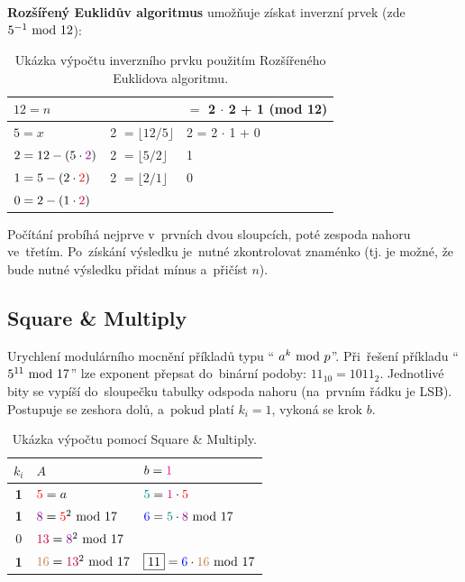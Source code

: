 \vspace*{1em} \noindent
\textbf{Rozšířený Euklidův algoritmus} umožňuje získat inverzní prvek (zde $5^{-1} \ \mathrm{mod}\ 12$):

\begin{table}[ht]
	\centering
\begin{tabular}{ll|l}
	$12 = n$                               & {}                                           & \boxed{\stackrel{?}{\pm} 5} $=$ {\color{violet}2} $\cdot$ {\color{blue}2} + {\color{brown}1} (mod 12) \\
	\hline
	$5 = x$                                & {\color{violet}2} $= \lfloor 12 / 5 \rfloor$ & {\color{blue}2} = {\color{red}2} $\cdot$ {\color{brown}1} + {\color{teal}0} \\
	$2 = 12 - (5 \cdot {\color{violet}2})$ & {\color{red}2}    $= \lfloor 5 / 2 \rfloor$  & {\color{brown}1} \\
	$1 = 5 - (2 \cdot {\color{red}2})$     & {\color{purple}2} $= \lfloor 2 / 1 \rfloor$  & {\color{teal}0} \\
	$0 = 2 - (1 \cdot {\color{purple}2})$  & {}                                           & {}
\end{tabular}
\caption*{Ukázka výpočtu inverzního prvku použitím Rozšířeného Euklidova algoritmu.}
\end{table}

\noindent
Počítání probíhá nejprve v~prvních dvou sloupcích, poté zespoda nahoru ve~třetím. Po~získání výsledku je~nutné zkontrolovat znaménko (tj. je možné, že bude nutné výsledku přidat mínus a~přičíst $n$).

\subsection{Square \& Multiply}

Urychlení modulárního mocnění příkladů typu \enquote{ $a^k \ \mathrm{mod}\ p$}. Při~řešení příkladu \enquote{$5^{11} \ \mathrm{mod}\ 17$} lze exponent přepsat do~binární podoby: $11_{10} = 1011_2$. Jednotlivé bity se vypíší do~sloupečku tabulky odspoda nahoru (na~prvním řádku je LSB). Postupuje se zeshora dolů, a~pokud platí $k_i = 1$, vykoná se krok $b$.

\begin{table}[ht]
\centering
\begin{tabular}{c|ll}
$k_i$      & $A$                                                & $b = {\color{magenta}1}$ \\
\hline
\textbf{1} & ${\color{red}5} = a$                               & ${\color{teal}5} = {\color{magenta}1} \cdot {\color{red}5}$ \\
\textbf{1} & ${\color{violet}8} = {\color{red}5}^2 \ \mathrm{mod}\ 17$     & ${\color{blue}6} = {\color{teal}5} \cdot {\color{violet}8} \ \mathrm{mod}\ 17$ \\
        0  & ${\color{purple}13} = {\color{violet}8}^2 \ \mathrm{mod}\ 17$ & \\
\textbf{1} & ${\color{brown}16} = {\color{purple}13}^2 \ \mathrm{mod}\ 17$ & $\boxed{11} = {\color{blue}6} \cdot {\color{brown}16} \ \mathrm{mod}\ 17$ \\
\end{tabular}
\caption*{Ukázka výpočtu pomocí Square \& Multiply.}
\end{table} 

